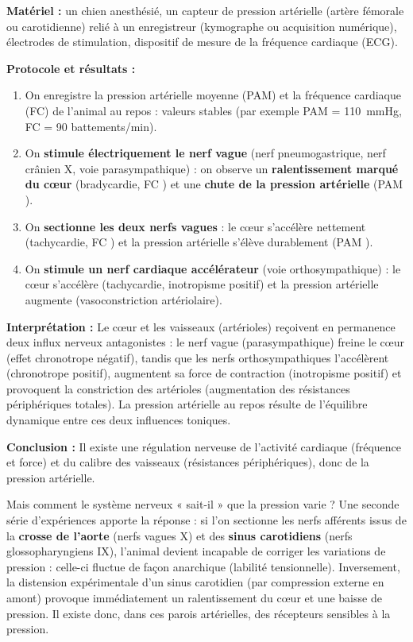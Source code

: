 \documentclass[11pt]{article}
\newcommand{\cle}[1]{{\popxbold\color{popdark}#1}}
\begin{document}
\begin{experience}
\textbf{Matériel :} un chien anesthésié, un capteur de pression artérielle (artère fémorale ou carotidienne) relié à un enregistreur (kymographe ou acquisition numérique), électrodes de stimulation, dispositif de mesure de la fréquence cardiaque (ECG).

\textbf{Protocole et résultats :}
\begin{enumerate}
\item On enregistre la pression artérielle moyenne (PAM) et la fréquence cardiaque (FC) de l'animal au repos : valeurs stables (par exemple PAM = \SI{110}{mmHg}, FC = 90 battements/min).
\item On \textbf{stimule électriquement le nerf vague} (nerf pneumogastrique, nerf crânien X, voie parasympathique) : on observe un \textbf{ralentissement marqué du cœur} (bradycardie, FC \textdownarrow) et une \textbf{chute de la pression artérielle} (PAM \textdownarrow).
\item On \textbf{sectionne les deux nerfs vagues} : le cœur s'accélère nettement (tachycardie, FC \textuparrow) et la pression artérielle s'élève durablement (PAM \textuparrow).
\item On \textbf{stimule un nerf cardiaque accélérateur} (voie orthosympathique) : le cœur s'accélère (tachycardie, inotropisme positif) et la pression artérielle augmente (vasoconstriction artériolaire).
\end{enumerate}

\textbf{Interprétation :} Le cœur et les vaisseaux (artérioles) reçoivent en permanence deux influx nerveux antagonistes : le nerf vague (parasympathique) freine le cœur (effet chronotrope négatif), tandis que les nerfs orthosympathiques l'accélèrent (chronotrope positif), augmentent sa force de contraction (inotropisme positif) et provoquent la constriction des artérioles (augmentation des résistances périphériques totales). La pression artérielle au repos résulte de l'équilibre dynamique entre ces deux influences toniques.

\textbf{Conclusion :} Il existe une régulation nerveuse de l'activité cardiaque (fréquence et force) et du calibre des vaisseaux (résistances périphériques), donc de la pression artérielle.
\end{experience}

Mais comment le système nerveux « sait-il » que la pression varie ? Une seconde série d'expériences apporte la réponse : si l'on sectionne les nerfs afférents issus de la \textbf{crosse de l'aorte} (nerfs vagues X) et des \textbf{sinus carotidiens} (nerfs glossopharyngiens IX), l'animal devient incapable de corriger les variations de pression : celle-ci fluctue de façon anarchique (labilité tensionnelle). Inversement, la distension expérimentale d'un sinus carotidien (par compression externe en amont) provoque immédiatement un ralentissement du cœur et une baisse de pression. Il existe donc, dans ces parois artérielles, des \cle{récepteurs sensibles à la pression}.
\end{document}
